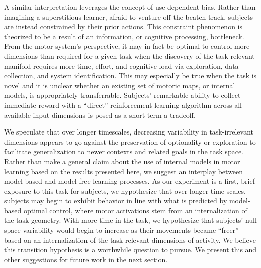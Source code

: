\documentclass[../main.tex]{subfiles}
\begin{document}
A similar interpretation leverages the concept of use-dependent bias. Rather than imagining a superstitious learner, afraid to venture off the beaten track, subjects are instead constrained by their prior actions\cite{tsayDissociableUsedependentProcesses2022}. This constraint phenomenon is theorized to be a result of an information, or cognitive processing, bottleneck\cite{dengUsedependentBiasesOptimal2024}. From the motor system's perspective, it may in fact be optimal to control more dimensions than required for a given task when the discovery of the task-relevant manifold requires more time, effort, and cognitive load via exploration, data collection, and system identification. This may especially be true when the task is novel and it is unclear whether an existing set of motoric maps, or internal models, is appropriately transferrable. Subjects' remarkable ability to collect immediate reward with a ``direct'' reinforcement learning algorithm across all available input dimensions is posed as a short-term a tradeoff.


We speculate that over longer timescales, decreasing variability in task-irrelevant dimensions appears to go against the preservation of optionality or exploration to facilitate generalization to newer contexts and related goals in the task space. Rather than make a general claim about the use of internal models in motor learning based on the results presented here, we suggest an interplay between model-based and model-free learning processes. As our experiment is a first, brief exposure to this task for subjects, we hypothesize that over longer time scales, subjects may begin to exhibit behavior in line with what is predicted by model-based optimal control, where motor activations stem from an internalization of the task geometry. With more time in the task, we hypothesize that subjects' null space variability would begin to increase as their movements became ``freer'' based on an internalization of the task-relevant dimensions of activity. We believe this transition hypothesis is a worthwhile question to pursue. We present this and other suggestions for future work in the next section.

\end{document}
